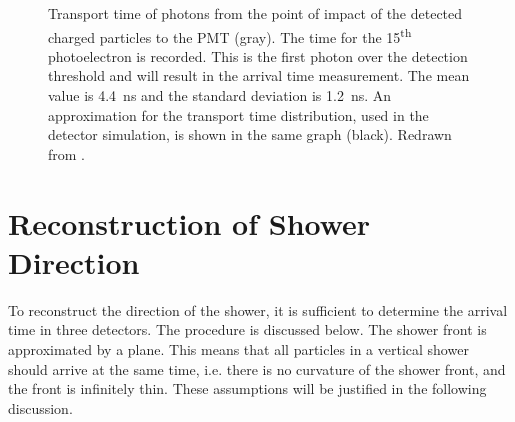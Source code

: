 \begin{figure}
\centering

\caption{Transport time of photons from the point of impact of the
detected charged particles to the PMT (gray).  The time for the
15\textsuperscript{th} photoelectron is recorded.  This is the first
photon over the detection threshold and will result in the arrival time
measurement.  The mean value is \SI{4.4}{\nano\second} and the standard
deviation is \SI{1.2}{\nano\second}.  An approximation for the transport
time distribution, used in the detector simulation, is shown in the same
graph (black).  Redrawn from \cite{Steijger:2010-time}.}
\label{fig:photon-arrival-times}
\end{figure}


\section{Reconstruction of Shower Direction}
\label{sec:direction-reconstruction-method}

To reconstruct the direction of the shower, it is sufficient to determine the
arrival time in three detectors.
The procedure is discussed below.  The
shower front is approximated by a plane.  This means that all particles in a
vertical shower should arrive at the same time, i.e.
there is no curvature of the shower front, and the front is infinitely thin.
These assumptions will be justified in the following discussion.

